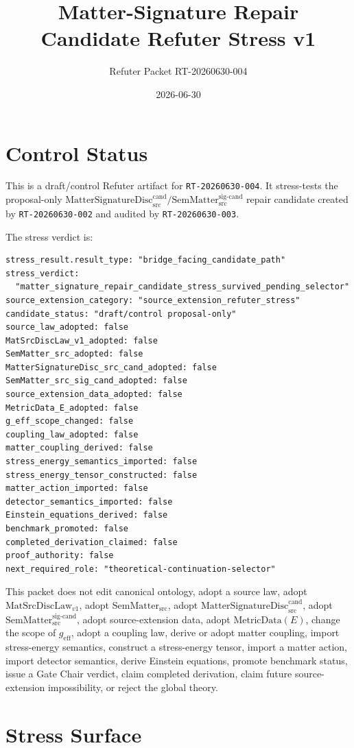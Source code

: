 \documentclass[11pt]{article}
\title{Matter-Signature Repair Candidate Refuter Stress v1}
\author{Refuter Packet RT-20260630-004}
\date{2026-06-30}
\newcommand{\MetricData}{\mathrm{MetricData}}
\newcommand{\geff}{g_{\mathrm{eff}}}
\newcommand{\MatSrcDiscLaw}{\mathrm{MatSrcDiscLaw}_{v1}}
\newcommand{\SemMatterSrc}{\mathrm{SemMatter}_{\mathrm{src}}}
\newcommand{\SemMatterSig}{\mathrm{SemMatter}_{\mathrm{src}}^{\mathrm{sig\text{-}cand}}}
\newcommand{\MatSigDisc}{\mathrm{MatterSignatureDisc}_{\mathrm{src}}^{\mathrm{cand}}}
\begin{document}
\maketitle

\section{Control Status}

This is a draft/control Refuter artifact for \texttt{RT-20260630-004}. It
stress-tests the proposal-only
\(\MatSigDisc / \SemMatterSig\) repair candidate created by
\texttt{RT-20260630-002} and audited by \texttt{RT-20260630-003}.

The stress verdict is:
\begin{verbatim}
stress_result.result_type: "bridge_facing_candidate_path"
stress_verdict:
  "matter_signature_repair_candidate_stress_survived_pending_selector"
source_extension_category: "source_extension_refuter_stress"
candidate_status: "draft/control proposal-only"
source_law_adopted: false
MatSrcDiscLaw_v1_adopted: false
SemMatter_src_adopted: false
MatterSignatureDisc_src_cand_adopted: false
SemMatter_src_sig_cand_adopted: false
source_extension_data_adopted: false
MetricData_E_adopted: false
g_eff_scope_changed: false
coupling_law_adopted: false
matter_coupling_derived: false
stress_energy_semantics_imported: false
stress_energy_tensor_constructed: false
matter_action_imported: false
detector_semantics_imported: false
Einstein_equations_derived: false
benchmark_promoted: false
completed_derivation_claimed: false
proof_authority: false
next_required_role: "theoretical-continuation-selector"
\end{verbatim}

This packet does not edit canonical ontology, adopt a source law, adopt
\(\MatSrcDiscLaw\), adopt \(\SemMatterSrc\), adopt \(\MatSigDisc\), adopt
\(\SemMatterSig\), adopt source-extension data, adopt \(\MetricData(E)\),
change the scope of \(\geff\), adopt a coupling law, derive or adopt matter
coupling, import stress-energy semantics, construct a stress-energy tensor,
import a matter action, import detector semantics, derive Einstein equations,
promote benchmark status, issue a Gate Chair verdict, claim completed
derivation, claim future source-extension impossibility, or reject the global
theory.

\section{Stress Surface}
\end{document}
